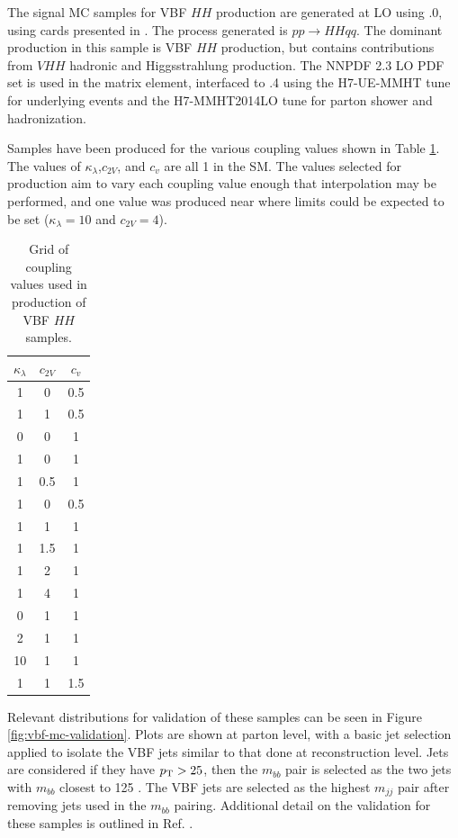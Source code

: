The signal MC samples for VBF $HH$ production are generated at LO using .0, using cards presented in \cite{vbfhh}. The process generated is $pp \rightarrow HHqq$. The dominant production in this sample is VBF $HH$ production, but contains contributions from $VHH$  hadronic and Higgsstrahlung production. The NNPDF 2.3 LO PDF set \cite{NNPDF} is used in the matrix element, interfaced to .4 using the H7-UE-MMHT tune for underlying events and the H7-MMHT2014LO tune for parton shower and hadronization.

Samples have been produced for the various coupling values shown in Table \ref{tab:vbf-coupling-samples}. The values of $\kappa_\lambda$,$c_{2V}$, and $c_{v}$ are all 1 in the SM. The values selected for production aim to vary each coupling value enough that interpolation may be performed, and one value was produced near where limits could be expected to be set ($\kappa_\lambda = 10$ and $c_{2V}=4$).

\begin{table}[htbp]
    \centering
    \begin{tabular}{c|c|c}
        $\kappa_\lambda$ & $c_{2V}$ & $c_{v}$ \\
        \hline
        1 & 0 & 0.5 \\
        1 & 1 & 0.5 \\
        0 & 0 & 1 \\
        1 & 0 & 1 \\
        1 & 0.5 & 1 \\
        1 & 0 & 0.5 \\
        1 & 1 & 1 \\
        1 & 1.5 & 1 \\
        1 & 2 & 1 \\
        1 & 4 & 1 \\
        0 & 1 & 1 \\
        2 & 1 & 1 \\
        10 & 1 & 1 \\
        1 & 1 & 1.5
    \end{tabular}
    \caption{Grid of coupling values used in production of VBF $HH$ samples.}
    \label{tab:vbf-coupling-samples}
\end{table}

Relevant distributions for validation of these samples can be seen in Figure \ref{fig:vbf-mc-validation}. Plots are shown at parton level, with a basic jet selection applied to isolate the VBF jets similar to that done at reconstruction level. Jets are considered if they have $p_{\text{T}} > 25$, then the $m_{bb}$ pair is selected as the two jets with $m_{bb}$ closest to 125 \GeV. The VBF jets are selected as the highest $m_{jj}$ pair after removing jets used in the $m_{bb}$ pairing. Additional detail on the validation for these samples is outlined in Ref. \cite{mc-validation}.

